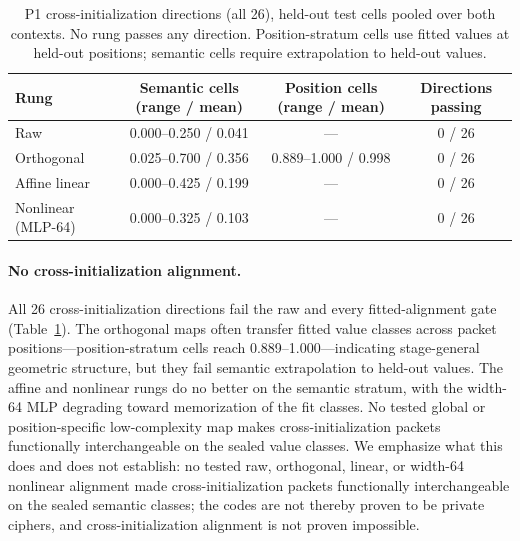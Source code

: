 \documentclass[11pt]{article}
\begin{document}
\begin{table}[t]
\centering
\caption{P1 cross-initialization directions (all 26), held-out test cells pooled over both contexts. No rung passes any direction. Position-stratum cells use fitted values at held-out positions; semantic cells require extrapolation to held-out values.}
\label{tab:p1cross}
\begin{tabular}{lccc}
\toprule
Rung & Semantic cells (range / mean) & Position cells (range / mean) & Directions passing \\
\midrule
Raw & 0.000--0.250 / 0.041 & \multicolumn{1}{c}{---} & 0 / 26 \\
Orthogonal & 0.025--0.700 / 0.356 & 0.889--1.000 / 0.998 & 0 / 26 \\
Affine linear & 0.000--0.425 / 0.199 & \multicolumn{1}{c}{---} & 0 / 26 \\
Nonlinear (MLP-64) & 0.000--0.325 / 0.103 & \multicolumn{1}{c}{---} & 0 / 26 \\
\bottomrule
\end{tabular}
\end{table}

\paragraph{No cross-initialization alignment.} All 26 cross-initialization directions fail the raw and every fitted-alignment gate (Table~\ref{tab:p1cross}). The orthogonal maps often transfer fitted value classes across packet positions---position-stratum cells reach 0.889--1.000---indicating stage-general geometric structure, but they fail semantic extrapolation to held-out values. The affine and nonlinear rungs do no better on the semantic stratum, with the width-64 MLP degrading toward memorization of the fit classes. No tested global or position-specific low-complexity map makes cross-initialization packets functionally interchangeable on the sealed value classes. We emphasize what this does and does not establish: no tested raw, orthogonal, linear, or width-64 nonlinear alignment made cross-initialization packets functionally interchangeable on the sealed semantic classes; the codes are not thereby proven to be private ciphers, and cross-initialization alignment is not proven impossible.
\end{document}

